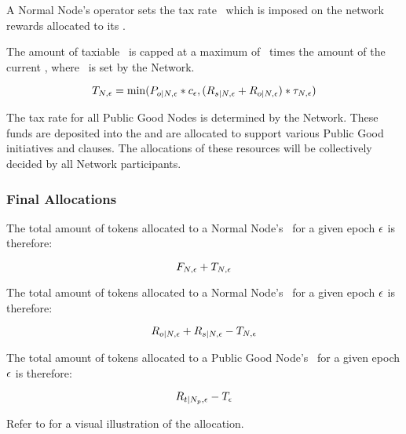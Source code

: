 A Normal Node's operator sets the tax rate \taxRate\ which is imposed on the network rewards allocated to its \stakingPool.

The amount of taxiable \stakingReward\ is capped at a maximum of \taxCap\ times the amount of the current \operationPool, where \taxCap\ is set by the Network.

\begin{equation}
    T_{N, \epsilon} =
    \min(P_{o|N, \epsilon}
    * c_{\epsilon} , (R_{s|N, \epsilon}
    + R_{o|N, \epsilon} )
    * \tau_{N, \epsilon})
\end{equation}

The tax rate for all Public Good Nodes is determined by the Network.
These funds are deposited into the  and are allocated to support various Public Good initiatives and clauses.
The allocations of these resources will be collectively decided by all Network participants.

\subsubsection{Final Allocations}
\label{subsubsec:allocation}

The total amount of tokens allocated to a Normal Node's \operationPool\ for a given epoch $\epsilon$ is therefore:

\begin{equation}
    F_{N, \epsilon}
    + T_{N, \epsilon}
\end{equation}

The total amount of tokens allocated to a Normal Node's \stakingPool\ for a given epoch $\epsilon$ is therefore:

\begin{equation}
    R_{o|N, \epsilon}
    + R_{s|N, \epsilon}
    - T_{N, \epsilon}
\end{equation}

The total amount of tokens allocated to a Public Good Node's \publicGoodPool\ for a given epoch $\epsilon$ is therefore:

\begin{equation}
    R_{t|N_p, \epsilon}
    - T_{\epsilon}
\end{equation}


Refer to  for a visual illustration of the  allocation.